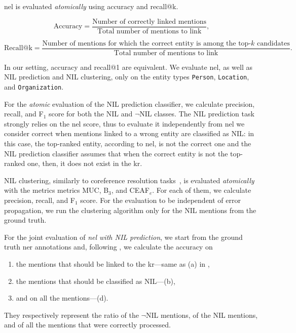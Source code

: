 \ac{nel} is evaluated \textit{atomically} using accuracy and recall@k.  

\begin{equation}
\text{Accuracy} = \frac{\text{Number of correctly linked mentions}}{\text{Total number of mentions to link}},
\end{equation}

\begin{equation}
\text{Recall@k} = \frac{\text{Number of mentions for which the correct entity is among the top-}k\text{ candidates}}{\text{Total number of mentions to link}}.
\end{equation}

In our setting, accuracy and recall@1 are equivalent.  
We evaluate \ac{nel}, as well as NIL prediction and NIL clustering, only on the entity types \texttt{Person}, \texttt{Location}, and \texttt{Organization}.



For the \textit{atomic} evaluation of the NIL prediction classifier, we calculate precision, recall, and F$_1$ score for both the NIL and $\neg$NIL classes. The NIL prediction task strongly relies on the \ac{nel} score, thus to evaluate it independently from \ac{nel} we consider correct when mentions linked to a wrong entity are classified as NIL: in this case, the top-ranked entity, according to \ac{nel}, is not the correct one and the NIL prediction classifier assumes that when the correct entity is not the top-ranked one, then, it does not exist in the \ac{kr}.

NIL clustering, similarly to coreference resolution tasks~\cite{streaming_crossdoc_coreference}, is evaluated \textit{atomically} with the metrics metrics MUC, B$_3$, and CEAF$_e$. For each of them, we calculate precision, recall, and F$_1$ score.
For the evaluation to be independent of error propagation, we run the clustering algorithm only for the NIL mentions from the ground truth.

For the joint evaluation of \textit{\ac{nel} with NIL prediction}, we start from the ground truth \ac{ner} annotations and, following , we calculate the accuracy on
\begin{enumerate}
    \item the mentions that should be linked to the \ac{kr}---same as (a) in ,
    \item the mentions that should be classified as NIL---(b),
    \item and on all the mentions---(d).
\end{enumerate}
They respectively represent the ratio of the $\neg$NIL mentions, of the NIL mentions, and of all the mentions that were correctly processed.

